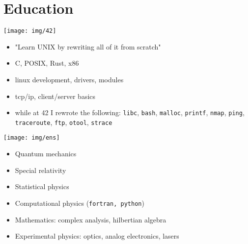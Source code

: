 \section{Education}

\noindent
\begin{minipage}{.15\textwidth}
\centerline{\texttt{[image: img/42]}}
\end{minipage}%
\hspace{5mm}
\begin{minipage}{.9\textwidth}
\raggedright
\begin{minipage}[t]{.50\textwidth}
    \begin{itemize}
        \item "Learn UNIX by rewriting all of it from scratch"
        \item C, POSIX, Rust, x86
        \item linux development, drivers, modules
        \item tcp/ip, client/server basics
    \end{itemize}
\end{minipage}
\begin{minipage}[t]{.30\textwidth}
    \begin{itemize}
		\item while at 42 I rewrote the following: \texttt{libc}, \texttt{bash}, \texttt{malloc}, \texttt{printf}, \texttt{nmap}, \texttt{ping}, \texttt{traceroute}, \texttt{ftp}, \texttt{otool}, \texttt{strace}
    \end{itemize}
\end{minipage}
\end{minipage}

\noindent
\begin{minipage}{.15\textwidth}
\centerline{\texttt{[image: img/ens]}}
\end{minipage}
\hspace{5mm}
\begin{minipage}{.9\textwidth}
\raggedright
\begin{minipage}[t]{.30\textwidth}
	\begin{itemize}
		\item Quantum mechanics
		\item Special relativity
		\item Statistical physics
	\end{itemize}
\end{minipage}
\begin{minipage}[t]{.60\textwidth}
	\begin{itemize}
		\item Computational physics (\texttt{fortran, python})
		\item Mathematics: complex analysis, hilbertian algebra
		\item Experimental physics: optics, analog electronics, lasers
	\end{itemize}
\end{minipage}
\end{minipage}

